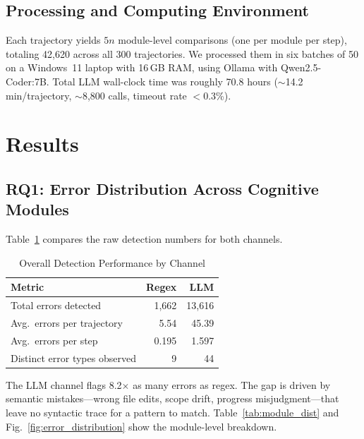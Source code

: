 \documentclass{ieeeaccess}
\begin{document}
\subsection{Processing and Computing Environment}

Each trajectory yields $5n$ module-level comparisons (one per module per step), totaling 42,620 across all 300 trajectories. We processed them in six batches of 50 on a Windows~11 laptop with 16\,GB RAM, using Ollama with Qwen2.5-Coder:7B. Total LLM wall-clock time was roughly 70.8 hours (${\sim}$14.2 min/trajectory, ${\sim}$8,800 calls, timeout rate $<$0.3\%).


\section{Results}
\label{sec:results}

\subsection{RQ1: Error Distribution Across Cognitive Modules}

Table~\ref{tab:overall} compares the raw detection numbers for both channels.

\begin{table}[h!]
\caption{Overall Detection Performance by Channel}
\label{tab:overall}
\centering
\setlength{\tabcolsep}{3pt}
\renewcommand{\arraystretch}{1.5}
\begin{tabularx}{\columnwidth}{|X|r|r|}
\hline
\textbf{Metric} & \textbf{Regex} & \textbf{LLM} \\
\hline
Total errors detected           & 1,662     & 13,616 \\
\hline
Avg.\ errors per trajectory     & 5.54      & 45.39 \\
\hline
Avg.\ errors per step           & 0.195     & 1.597 \\
\hline
Distinct error types observed   & 9         & 44 \\
\hline
\end{tabularx}
\end{table}

The LLM channel flags 8.2$\times$ as many errors as regex. The gap is driven by semantic mistakes---wrong file edits, scope drift, progress misjudgment---that leave no syntactic trace for a pattern to match. Table~\ref{tab:module_dist} and Fig.~\ref{fig:error_distribution} show the module-level breakdown.
\end{document}
